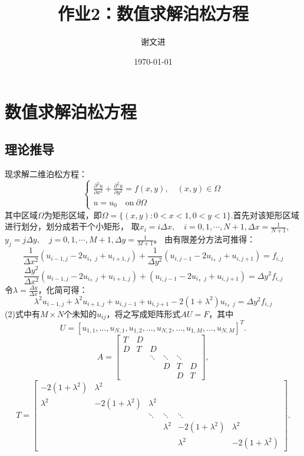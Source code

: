 \documentclass{ctexart}
\title{作业2：数值求解泊松方程}
\author{谢文进}
\date{\today}
\begin{document}
\maketitle
\section{数值求解泊松方程}
\subsection{理论推导}
现求解二维泊松方程：
\begin{equation}%
    \begin{cases}
        \frac{\partial^2 u}{\partial x^2} + \frac{\partial^2 u}{\partial y^2} = f(x,y), \quad (x, y)\in \Omega\\
        u = u_0 \quad \text{on} \ \partial \Omega
    \end{cases}	
\end{equation}
其中区域$\Omega$为矩形区域，即$\Omega=\{(x,y):0<x<1, 0<y<1\}$.首先对该矩形区域进行划分，划分成若干个小矩形，
取$x_i=i \Delta x,\quad i = 0,1,\cdots,N+1,\Delta x = \frac{1}{N+1}$,
$y_j=j \Delta y,\quad j = 0,1,\cdots,M+1,\Delta y = \frac{1}{M+1}$。  
由有限差分方法可推得：
\begin{displaymath} %
    \frac{1}{\Delta x^2}(u_{i-1,j}-2u_{i，j}+u_{i+1,j}) +
\frac{1}{\Delta y^2}(u_{i,j-1}-2u_{i，j}+u_{i,j+1}) =f_{i,j}
\end{displaymath}
\begin{displaymath}
    \frac{\Delta y^2}{\Delta x^2}(u_{i-1,j}-2u_{i，j}+u_{i+1,j})+
    (u_{i,j-1}-2u_{i，j}+u_{i,j+1})=\Delta y^2f_{i,j}
\end{displaymath}
令$\lambda=\frac{\Delta y}{\Delta x}$，化简可得：
\begin{equation}
    \lambda ^2u_{i-1,j}+\lambda ^2u_{i+1,j}+u_{i,j-1}+u_{i,j+1}-2(1+\lambda ^2)u_{i，j}=\Delta y^2f_{i,j}
\end{equation}
(2)式中有$M \times N$个未知的$u_{ij}$，将之写成矩阵形式$AU=F$，其中
$$
    U = [u_{1,1}, \ldots, u_{N,1},u_{1,2},\ldots,u_{N,2},\ldots, u_{1,M},\ldots, u_{N,M}]^T.
$$
$$
A = \begin{bmatrix}T & D \\ D & T & D \\ & & \ddots & \ddots &\ddots \\ & & & D & T & D \\ &&&& D & T\end{bmatrix},
$$
$$
T = \begin{bmatrix}-2(1+\lambda^2) & \lambda^2 \\ \lambda^2 & -2(1+\lambda^2) & \lambda^2 \\ & & \ddots & \ddots &\ddots \\ & & & \lambda^2 & -2(1+\lambda^2) & \lambda^2 \\ &&&& \lambda^2 & -2(1+\lambda^2)\end{bmatrix}.
$$
\end{document}
